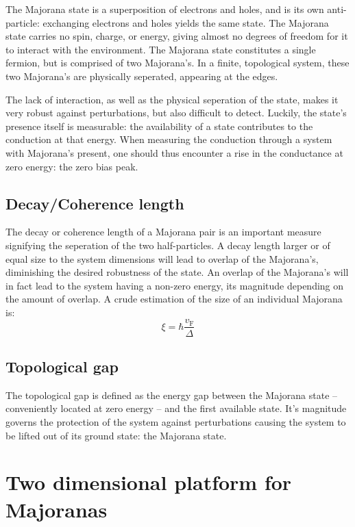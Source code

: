 		The Majorana state is a superposition of electrons and holes, and is its own anti-particle: exchanging electrons and holes yields the same state.
		The Majorana state carries no spin, charge, or energy, giving almost no degrees of freedom for it to interact with the environment.
		The Majorana state constitutes a single fermion, but is comprised of two Majorana's.
		In a finite, topological system, these two Majorana's are physically seperated, appearing at the edges.

		The lack of interaction, as well as the physical seperation of the state, makes it very robust against perturbations, but also difficult to detect.
		Luckily, the state's presence itself is measurable: the availability of a state contributes to the conduction at that energy.
		When measuring the conduction through a system with Majorana's present, one should thus encounter a rise in the conductance at zero energy: the zero bias peak.

	\subsection{Decay/Coherence length}
		The decay or coherence length of a Majorana pair is an important measure signifying the seperation of the two half-particles.
		A decay length larger or of equal size to the system dimensions will lead to overlap of the Majorana's, diminishing the desired robustness of the state.
		An overlap of the Majorana's will in fact lead to the system having a non-zero energy, its magnitude depending on the amount of overlap.
		A crude estimation of the size of an individual Majorana is:
		\begin{equation}
			\xi = \hbar \frac{v_\text{F}}{\Delta}
			\label{eq:majorana_coherence_length}
		\end{equation}

	\subsection{Topological gap}
		The topological gap is defined as the energy gap between the Majorana state -- conveniently located at zero energy -- and the first available state.
		It's magnitude governs the protection of the system against perturbations causing the system to be lifted out of its ground state: the Majorana state.

\section{Two dimensional platform for Majoranas}

